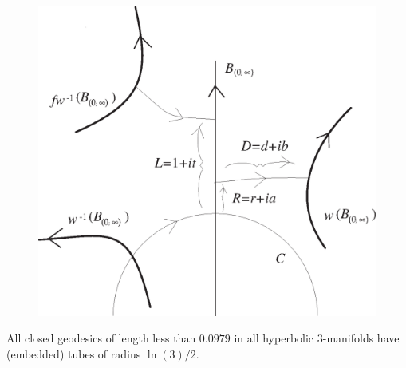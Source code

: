 \begin{figure}[h]\label{GMT fig 1.1}
	\centering
	\includegraphics[scale=0.500]{fig1.1}
\end{figure}

\begin{proposition}\label{GMT prop1.10} All closed geodesics of length less than $0.0979$ in
all hyperbolic $3$\/{\textrm -}\/manifolds have {\textrm (}\/embedded\/{\textrm )} tubes of
radius $\ln(3)/2.$
\end{proposition}


